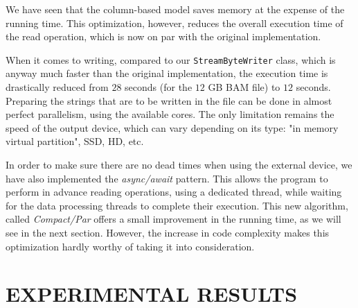 \documentclass[a4paper,twoside]{article}
\begin{document}
We have seen that the column-based model saves memory at the expense of the running time.
This optimization, however, reduces the overall execution time of the read operation, which is now on par with the original implementation.

When it comes to writing, compared to our {\tt StreamByteWriter} class, which is anyway much faster than the original implementation, the execution time is drastically reduced from $28$ seconds (for the $12$ GB BAM file) to $12$ seconds.
Preparing the strings that are to be written in the file can be done in almost perfect parallelism, using the available cores. The only limitation remains the speed of the output device, which can vary depending on its type: "in memory virtual partition", SSD, HD, etc.
	
In order to make sure there are no dead times when using the external device, 
we have also implemented the {\it async/await} pattern. 
This allows the program to perform in advance reading operations, using a dedicated thread, while waiting for the data processing threads to complete their execution.
This new algorithm, called {\it Compact/Par} offers a small improvement in the running time, as we will see in the next section. However, the increase in code complexity makes this optimization hardly worthy of taking it into consideration.






\section{\uppercase{Experimental Results}}
\end{document}
